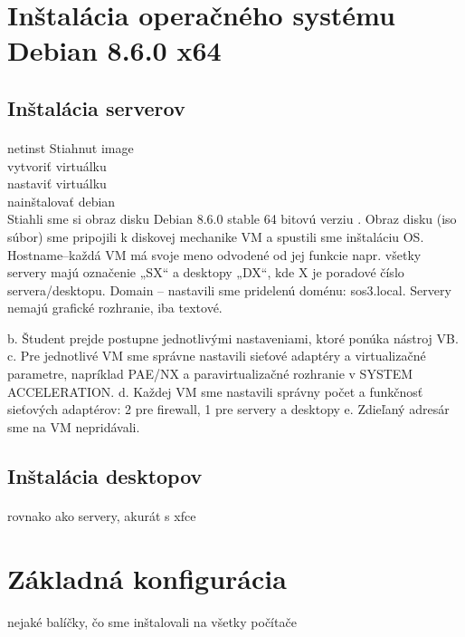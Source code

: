 \section{Inštalácia operačného systému Debian 8.6.0 x64}
\subsection{Inštalácia serverov}
\paragraph{}
netinst
Stiahnut image\\
vytvoriť virtuálku\\
nastaviť virtuálku\\
nainštalovať debian\\

Stiahli sme si obraz disku Debian 8.6.0 stable 64 bitovú verziu . Obraz disku (iso súbor) sme pripojili k diskovej mechanike VM a spustili sme inštaláciu OS. Hostname–každá VM má svoje meno odvodené od jej funkcie napr. všetky servery majú označenie „SX“ a desktopy „DX“, kde X je poradové číslo servera/desktopu. Domain – nastavili sme pridelenú doménu: sos3.local. Servery nemajú grafické rozhranie, iba textové. 

b. Študent prejde postupne jednotlivými nastaveniami, ktoré ponúka nástroj VB.
c. Pre jednotlivé VM sme správne nastavili sieťové adaptéry a virtualizačné parametre, napríklad PAE/NX  a paravirtualizačné rozhranie v SYSTEM ACCELERATION.
d. Každej VM sme nastavili správny počet a funkčnosť sieťových adaptérov: 2 pre firewall, 1 pre servery a desktopy
e. Zdieľaný adresár sme na VM nepridávali.

\subsection{Inštalácia desktopov}
\paragraph{}
rovnako ako servery, akurát s xfce

\section{Základná konfigurácia}
\paragraph{}
nejaké balíčky, čo sme inštalovali na všetky počítače

